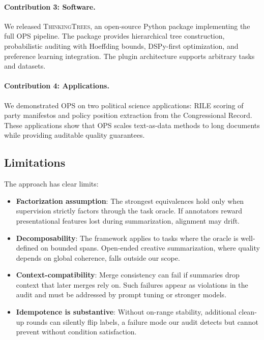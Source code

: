 \paragraph{Contribution 3: Software.}
We released \textsc{ThinkingTrees}, an open-source Python package implementing the full OPS pipeline. The package provides hierarchical tree construction, probabilistic auditing with Hoeffding bounds, DSPy-first optimization, and preference learning integration. The plugin architecture supports arbitrary tasks and datasets.

\paragraph{Contribution 4: Applications.}
We demonstrated OPS on two political science applications: RILE scoring of party manifestos and policy position extraction from the Congressional Record. These applications show that OPS scales text-as-data methods to long documents while providing auditable quality guarantees.

\subsection{Limitations}

The approach has clear limits:

\begin{itemize}[nosep]
    \item \textbf{Factorization assumption}: The strongest equivalences hold only when supervision strictly factors through the task oracle. If annotators reward presentational features lost during summarization, alignment may drift.

    \item \textbf{Decomposability}: The framework applies to tasks where the oracle is well-defined on bounded spans. Open-ended creative summarization, where quality depends on global coherence, falls outside our scope.

    \item \textbf{Context-compatibility}: Merge consistency can fail if summaries drop context that later merges rely on. Such failures appear as violations in the audit and must be addressed by prompt tuning or stronger models.

    \item \textbf{Idempotence is substantive}: Without on-range stability, additional clean-up rounds can silently flip labels, a failure mode our audit detects but cannot prevent without condition satisfaction.
\end{itemize}

